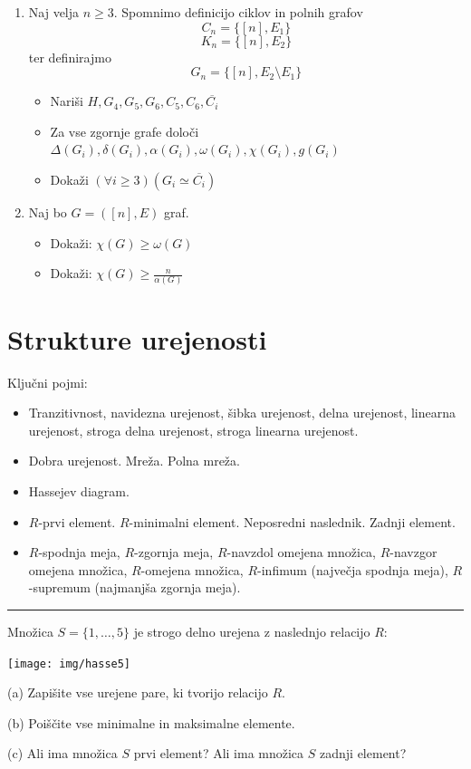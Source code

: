 \documentclass[11pt,paper=b5,footinclude,headinclude]{scrbook} %
\newtheorem{ex}{Vaja\hypertarget{sol:\theex}}[chapter]
\begin{document}
\begin{enumerate}
\item Naj velja $n\ge 3$. Spomnimo definicijo ciklov in polnih grafov
\[C_{n}=\{[n], E_{1}\}\]
\[K_{n}=\{[n], E_{2}\}\]
ter definirajmo 
\[G_{n}=\{[n], E_{2} \setminus E_{1}\}\]
\begin{itemize}
    \item Nariši \(H, G_{4}, G_{5}, G_{6}, C_{5}, C_{6}, \overline{C_{i}}\)
    \item Za  vse zgornje grafe določi \(\Delta(G_{i}), \delta(G_{i}), \alpha(G_{i}), \omega(G_{i}), \chi(G_{i}), g(G_{i})\)
    \item
Dokaži \((\forall i \geq 3) (G_{i} \simeq \overline{C_{i}})\)
\end{itemize}


\item
Naj bo \(G = ([n], E)\) graf.
\begin{itemize}
\item
Dokaži: \(\chi (G) \geq \omega (G)\)

\item
Dokaži: \(\chi (G) \geq \frac{n}{\alpha(G)}\)
\end{itemize}

\end{enumerate}


\section{Strukture urejenosti}
Ključni pojmi:
\begin{itemize}
\item Tranzitivnost, navidezna urejenost, šibka urejenost, delna urejenost,
linearna urejenost, stroga delna urejenost, stroga linearna urejenost.
\item Dobra urejenost. Mreža. Polna mreža.
\item Hassejev diagram.
\item $R$-prvi element. $R$-minimalni element. Neposredni naslednik. Zadnji element.
\item $R$-spodnja meja, $R$-zgornja meja, $R$-navzdol omejena množica, $R$-navzgor omejena
množica, $R$-omejena množica, $R$-infimum (največja spodnja meja),
$R$-supremum (najmanjša zgornja meja).
\end{itemize}
\hrule
\begin{ex}\label{ex:hasse5}
Množica $S=\{1,\ldots,5\}$ je strogo delno urejena z naslednjo relacijo $R$:
\begin{center}
\texttt{[image: img/hasse5]}
\end{center}

(a) Zapišite vse urejene pare, ki tvorijo relacijo $R$.

(b) Poiščite vse minimalne in maksimalne elemente.

(c) Ali ima množica $S$ prvi element? Ali ima množica $S$ zadnji element?

\end{ex}
\end{document}
